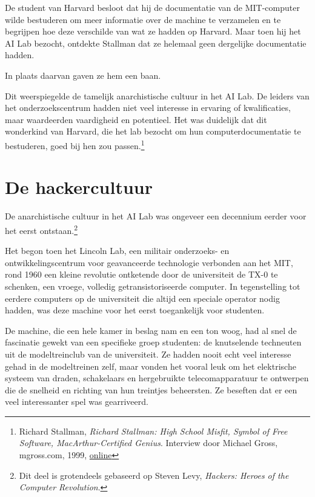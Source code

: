 \documentclass[
  a5paper,
  smalldemyvopaper,11pt,twoside,onecolumn,openright,extrafontsizes,
hidelinks]{memoir}
\begin{document}
De student van Harvard besloot dat hij de documentatie van de
MIT-computer wilde bestuderen om meer informatie over de machine te
verzamelen en te begrijpen hoe deze verschilde van wat ze hadden op
Harvard. Maar toen hij het AI Lab bezocht, ontdekte Stallman dat ze
helemaal geen dergelijke documentatie hadden.

In plaats daarvan gaven ze hem een baan.

Dit weerspiegelde de tamelijk anarchistische cultuur in het AI Lab. De
leiders van het onderzoekscentrum hadden niet veel interesse in ervaring
of kwalificaties, maar waardeerden vaardigheid en potentieel. Het was
duidelijk dat dit wonderkind van Harvard, die het lab bezocht om hun
computerdocumentatie te bestuderen, goed bij hen zou passen.\footnote{Richard
  Stallman, \emph{Richard Stallman: High School Misfit, Symbol of Free
  Software, MacArthur-Certified Genius}. Interview door Michael Gross,
  mgross.com, 1999,
  \href{https://www.mgross.com/writing/books/my-generation/bonus-chapters/richard-stallman-high-school-misfit-symbol-of-free-software-macarthur-certified-genius/.}{online}}

\section{De hackercultuur}\label{de-hackercultuur}

De anarchistische cultuur in het AI Lab was ongeveer een decennium
eerder voor het eerst ontstaan.\footnote{Dit deel is grotendeels
  gebaseerd op Steven Levy, \emph{Hackers: Heroes of the Computer
  Revolution}.}

Het begon toen het Lincoln Lab, een militair onderzoeks- en
ontwikkelingscentrum voor geavanceerde technologie verbonden aan het
MIT, rond 1960 een kleine revolutie ontketende door de universiteit de
TX-0 te schenken, een vroege, volledig getransistoriseerde computer. In
tegenstelling tot eerdere computers op de universiteit die altijd een
speciale operator nodig hadden, was deze machine voor het eerst
toegankelijk voor studenten.

De machine, die een hele kamer in beslag nam en een ton woog, had al
snel de fascinatie gewekt van een specifieke groep studenten: de
knutselende techneuten uit de modeltreinclub van de universiteit. Ze
hadden nooit echt veel interesse gehad in de modeltreinen zelf, maar
vonden het vooral leuk om het elektrische systeem van draden,
schakelaars en hergebruikte telecomapparatuur te ontwerpen die de
snelheid en richting van hun treintjes beheersten. Ze beseften dat er
een veel interessanter spel was gearriveerd.
\end{document}
